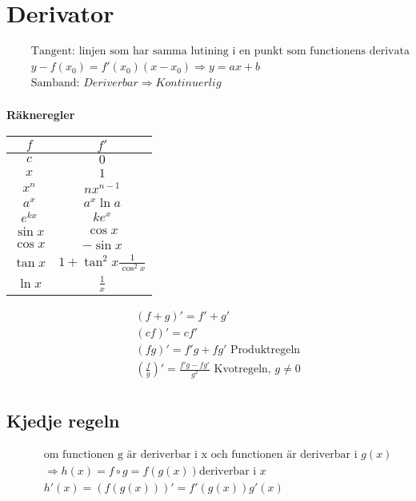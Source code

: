\documentclass{article}
\begin{document}
\section{Derivator}
\begin{align*}
  &\quad  \text{Tangent: linjen som har samma lutining i en punkt som functionens derivata} \\
  &\quad  y-f(x_0)=f'(x_0)(x-x_0) \Rightarrow y=ax+b \\ %
  &\quad  \text{Samband: } Deriverbar \Rightarrow Kontinuerlig \\
\end{align*}

\textbf{Räkneregler}
\begin{center}
\begin{tabular}{ |c|c| } 
 \hline
 $f$       & $f'$         \\
 \hline
 $c$       & $0$          \\
 $x$       & $1$          \\ 
 $x^n$     & $nx^{n-1}$    \\  
 $a^x$     & $a^x\ln{a}$   \\ 
 $e^{kx}$  & $ke^{x}$       \\
 $\sin{x}$ & $\cos{x}$     \\
 $\cos{x}$ & $-\sin{x}$    \\
 $\tan{x}$ & $1+\tan^2{x}\frac{1}{\cos^2{x}}$    \\
 $\ln{x}$  & $\frac{1}{x}$ \\
 \hline
\end{tabular}
\end{center}

\begin{align*}
  &\quad  (f+g)' = f' + g' \\
  &\quad  (cf)'  = cf' \\
  &\quad  (fg)'  = f'g + fg' \text{ Produktregeln} \\
  &\quad  (\frac{f}{g})' = \frac{f'g - fg'}{g^2} \text{ Kvotregeln, } g \neq 0 \\
\end{align*}


\subsection{Kjedje regeln}
\begin{align*}
  &\quad  \text{om functionen g är deriverbar i x och functionen är deriverbar i } g(x) \\
  &\quad  \Rightarrow h(x)=f \circ g = f(g(x)) \text{deriverbar i } x \\
  &\quad  h'(x)=(f(g(x)))'=f'(g(x))g'(x) \\ 
\end{align*}
\end{document}
